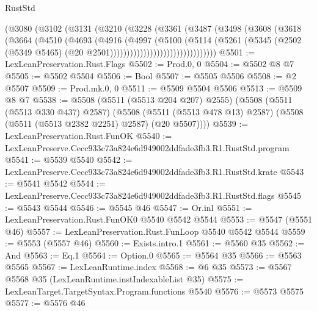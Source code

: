 \begin{lexlean}{RustStd}
\begin{coremodule}
                          (@3080
                            (@3102
                              (@3131
                                (@3210
                                  (@3228
                                    (@3361
                                      (@3487
                                        (@3498
                                          (@3608
                                            (@3618
                                              (@3664
                                                (@4510
                                                  (@4693
                                                    (@4916
                                                      (@4997
                                                        (@5100
                                                          (@5114
                                                            (@5261
                                                              (@5345
                                                                (@2502
                                                                  (@5349 @5465)
                                                                  (@20
                                                                    @2501))))))))))))))))))))))))))))))))
@5501 := LexLeanPreservation.Rust.Flags
@5502 := Prod.{0, 0}
@5504 := @5502 @8 @7
@5505 := @5502 @5504
@5506 := Bool
@5507 := @5505 @5506
@5508 := @2 @5507
@5509 := Prod.mk.{0, 0}
@5511 := @5509 @5504 @5506
@5513 := @5509 @8 @7
@5538 := @5508
    (@5511 (@5513 @204 @207) @2555)
    (@5508
      (@5511 (@5513 @330 @437) @2587)
      (@5508 (@5511 (@5513 @478 @13) @2587) (@5508 (@5511 (@5513 @2382 @2251) @2587) (@20 @5507))))
@5539 := LexLeanPreservation.Rust.FunOK
@5540 := LexLeanPreserve.Cecc933c73a824e6d949002ddfade3fb3.R1.RustStd.program
@5541 := @5539 @5540
@5542 := LexLeanPreserve.Cecc933c73a824e6d949002ddfade3fb3.R1.RustStd.krate
@5543 := @5541 @5542
@5544 := LexLeanPreserve.Cecc933c73a824e6d949002ddfade3fb3.R1.RustStd.flags
@5545 := @5543 @5544
@5546 := @5545 @46
@5547 := Or.inl
@5551 := LexLeanPreservation.Rust.FunOK0 @5540 @5542 @5544
@5553 := @5547 (@5551 @46)
@5557 := LexLeanPreservation.Rust.FunLoop @5540 @5542 @5544
@5559 := @5553 (@5557 @46)
@5560 := Exists.intro.{1}
@5561 := @5560 @35
@5562 := And
@5563 := Eq.{1}
@5564 := Option.{0}
@5565 := @5564 @35
@5566 := @5563 @5565
@5567 := LexLeanRuntime.index
@5568 := @6 @35
@5573 := @5567 @5568 @35 (LexLeanRuntime.instIndexableList @35)
@5575 := LexLeanTarget.TargetSyntax.Program.functions @5540
@5576 := @5573 @5575
@5577 := @5576 @46

\end{coremodule}
\end{lexlean}
